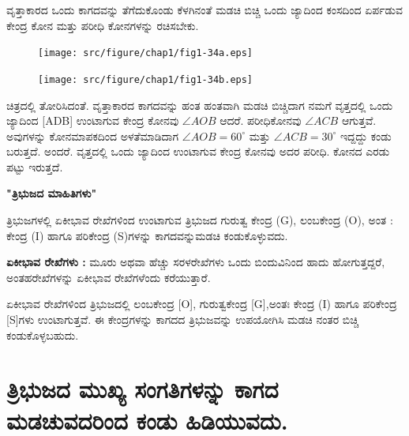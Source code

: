 ವೃತ್ತಾಕಾರದ ಒಂದು ಕಾಗದವನ್ನು ತೆಗೆದುಕೊಂಡು ಕೆಳಗಿನಂತೆ ಮಡಚಿ ಬಿಚ್ಚಿ ಒಂದು ಜ್ಯಾದಿಂದ ಕಂಸದಿಂದ ಏರ್ಪಡುವ ಕೇಂದ್ರ ಕೋನ ಮತ್ತು ಪರೀಧಿ ಕೋನಗಳನ್ನು ರಚಿಸಬೇಕು. 
\begin{figure}[H]
\centering
\texttt{[image: src/figure/chap1/fig1-34a.eps]}
\end{figure}
    \begin{figure}[H]
\centering
\texttt{[image: src/figure/chap1/fig1-34b.eps]}
\end{figure}
 
 ಚಿತ್ರದಲ್ಲಿ ತೋರಿಸಿದಂತೆ. ವೃತ್ತಾಕಾರದ ಕಾಗದವನ್ನು ಹಂತ ಹಂತವಾಗಿ ಮಡಚಿ ಬಿಚ್ಚಿ\break ದಾಗ ನಮಗೆ ವೃತ್ತದಲ್ಲಿ ಒಂದು ಜ್ಯಾದಿಂದ [ADB] ಉಂಟಾಗುವ ಕೇಂದ್ರ ಕೋನವು $\angle AOB$  ಆದರೆ. ಪರೀಧಿಕೋನವು $\angle ACB$ ಆಗುತ್ತವೆ. ಅವುಗಳನ್ನು ಕೋನಮಾಪಕದಿಂದ ಅಳತೆಮಾಡಿದಾಗ $\angle AOB = 60^\circ$ ಮತ್ತು $\angle ACB = 30^\circ$ ಇದ್ದದ್ದು ಕಂಡು ಬರುತ್ತದೆ. ಅಂದರೆ. ವೃತ್ತದಲ್ಲಿ ಒಂದು ಜ್ಯಾದಿಂದ ಉಂಟಾಗುವ ಕೇಂದ್ರ ಕೋನವು ಅದರ ಪರೀಧಿ. ಕೋನದ ಎರಡು ಪಟ್ಟು ಇರುತ್ತದೆ. 
 
 \smallskip
 \noindent
  \textbf{"ತ್ರಿಭುಜದ ಮಾಹಿತಿಗಳು"}
  
  ತ್ರಿಭುಜಗಳಲ್ಲಿ ಏಕೀಭಾವ ರೇಖೆಗಳಿಂದ ಉಂಟಾಗುವ ತ್ರಿಭುಜದ ಗುರುತ್ವ ಕೇಂದ್ರ (G), ಲಂಬಕೇಂದ್ರ  (O), ಅಂತ : ಕೇಂದ್ರ (I) ಹಾಗೂ  ಪರಿಕೇಂದ್ರ (S)ಗಳನ್ನು ಕಾಗದವನ್ನು\break ಮಡಚಿ ಕಂಡುಕೊಳ್ಳುವದು. 
  
  \noindent
    \textbf{ಏಕೀಭಾವ ರೇಖೆಗಳು :} ಮೂರು ಅಥವಾ ಹೆಚ್ಚು ಸರಳರೇಖೆಗಳು ಒಂದು ಬಿಂದುವಿನಿಂದ ಹಾದು ಹೋಗುತ್ತದ್ದರೆ, ಅಂತಹರೇಖೆಗಳನ್ನು ಏಕೀಭಾವ ರೇಖೆಗಳೆಂದು ಕರೆಯುತ್ತಾರೆ. 
    
    ಏಕೀಭಾವ ರೇಖೆಗಳಿಂದ ತ್ರಿಭುಜದಲ್ಲಿ ಲಂಬಕೇಂದ್ರ [O], ಗುರುತ್ವಕೇಂದ್ರ  [G],\break ಅಂತಃ ಕೇಂದ್ರ  (I) ಹಾಗೂ ಪರಿಕೇಂದ್ರ [S]ಗಳು ಉಂಟಾಗುತ್ತವೆ. ಈ ಕೇಂದ್ರಗಳನ್ನು ಕಾಗದದ ತ್ರಿಭುಜವನ್ನು ಉಪಯೋಗಿಸಿ ಮಡಚಿ ನಂತರ ಬಿಚ್ಚಿ ಕಂಡುಕೊಳ್ಳಬಹುದು. 

\section{ತ್ರಿಭುಜದ ಮುಖ್ಯ ಸಂಗತಿಗಳನ್ನು ಕಾಗದ ಮಡಚುವದರಿಂದ ಕಂಡು ಹಿಡಿಯುವದು. }\label{sec1.13}%
      
